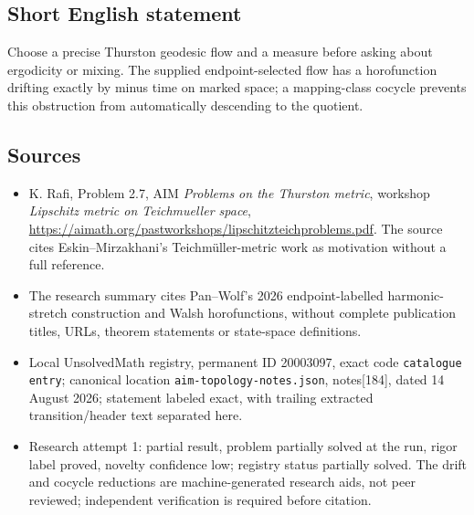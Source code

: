 \documentclass[11pt]{article}
\begin{document}
\subsection{Short English statement}
Choose a precise Thurston geodesic flow and a measure before asking about ergodicity or mixing. The supplied endpoint-selected flow has a horofunction drifting exactly by minus time on marked space; a mapping-class cocycle prevents this obstruction from automatically descending to the quotient.
\subsection{Sources}
\begin{itemize}
\item K. Rafi, Problem 2.7, AIM \emph{Problems on the Thurston metric}, workshop \emph{Lipschitz metric on Teichmueller space}, \url{https://aimath.org/pastworkshops/lipschitzteichproblems.pdf}. The source cites Eskin--Mirzakhani's Teichm\"uller-metric work as motivation without a full reference.
\item The research summary cites Pan--Wolf's 2026 endpoint-labelled harmonic-stretch construction and Walsh horofunctions, without complete publication titles, URLs, theorem statements or state-space definitions.
\item Local UnsolvedMath registry, permanent ID 20003097, exact code \texttt{catalogue entry}; canonical location \texttt{aim-topology-notes.json}, notes[184], dated 14 August 2026; statement labeled exact, with trailing extracted transition/header text separated here.
\item Research attempt 1: partial result, problem partially solved at the run, rigor label proved, novelty confidence low; registry status partially solved. The drift and cocycle reductions are machine-generated research aids, not peer reviewed; independent verification is required before citation.
\end{itemize}
\end{document}
